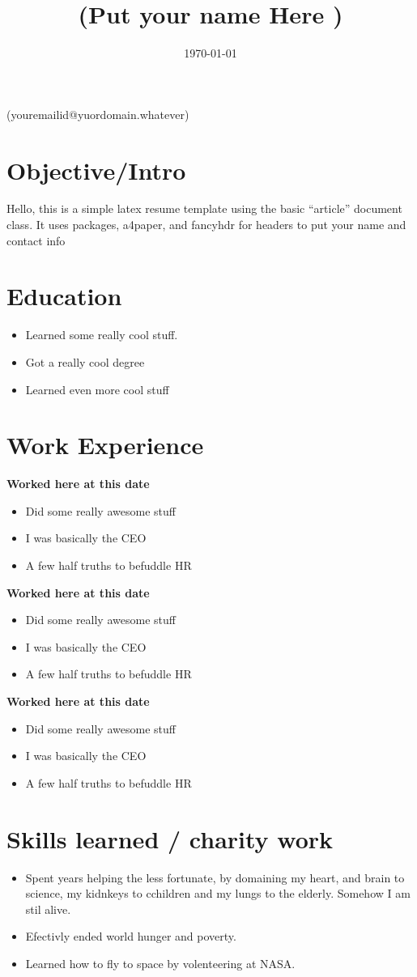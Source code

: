 \documentclass{article}
\title{  (Put your name Here ) }
\begin{document}
\date{\today}

\begin{center} (youremailid@yuordomain.whatever)         \end{center}

\section*{Objective/Intro}
 Hello, this is a simple latex resume template using the basic ``article'' document class.  It uses packages, a4paper, and fancyhdr for headers to put your name and contact info

\section*{Education}
\begin{itemize}
   \item Learned some really cool stuff.
   \item Got a really cool degree
   \item Learned even more cool stuff
\end{itemize}

\section*{Work Experience}
\textbf{Worked here at this date }
\begin{itemize}
   \item Did some really awesome stuff
   \item I was basically the CEO
   \item A few half truths to befuddle HR
\end{itemize}
\textbf{Worked here at this date}
\begin{itemize}
   \item Did some really awesome stuff
   \item I was basically the CEO
   \item A few half truths to befuddle HR
\end{itemize}
\textbf{Worked here at this date}
\begin{itemize}
   \item Did some really awesome stuff
   \item I was basically the CEO
   \item A few half truths to befuddle HR
\end{itemize}

\section*{Skills learned / charity work}
\begin{itemize}
    \item Spent years helping the less fortunate, by domaining my heart, and brain to science, my kidnkeys to cchildren and my lungs to the elderly. Somehow I am stil alive.
    \item Efectivly ended world hunger and poverty.
    \item Learned how to fly to space by volenteering at NASA.
\end{itemize}
  
\end{document}
